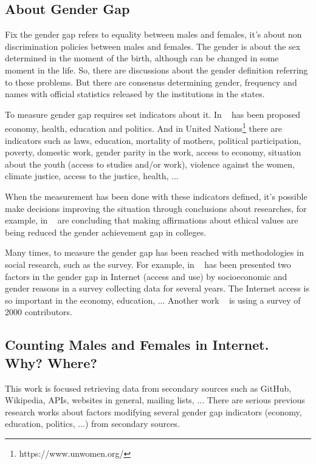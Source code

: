 \documentclass[a4paper]{article}
\begin{document}
\subsection{About Gender Gap}

Fix the gender gap refers to equality between males and females, it's
about non discrimination policies between males and females. The
gender is about the sex determined in the moment of the birth,
although can be changed in some moment in the life. So, there are
discussions about the gender definition referring to these
problems. But there are consensus determining gender, frequency and
names with official statistics released by the institutions in the
states.

To measure gender gap requires set indicators about it. In
~\cite{world2021global} has been proposed economy, health, education
and politics. And in United Nations\footnote{https://www.unwomen.org/}
there are indicators such as laws, education, mortality of mothers,
political participation, poverty, domestic work, gender parity in
the work, access to economy, situation about the youth (access to
studies and/or work), violence against the women, climate justice,
access to the justice, health, ...

When the measurement has been done with these indicators defined, it's
possible make decisions improving the situation through conclusions
about researches, for example, in ~\cite{miyake2010reducing} are
concluding that making affirmations about ethical values are being
reduced the gender achievement gap in colleges.

Many times, to measure the gender gap has been reached with
methodologies in social research, such as the survey. For example, in
~\cite{bimber2000measuring} has been presented two factors in the
gender gap in Internet (access and use) by socioeconomic and gender
reasons in a survey collecting data for several years. The Internet
access is so important in the economy, education, ... Another work
~\cite{10.1007/978-3-319-39225-7_13} is using a survey of 2000
contributors.

\subsection{Counting Males and Females in Internet. Why? Where?}

This work is focused retrieving data from secondary sources such as
GitHub, Wikipedia, APIs, websites in general, mailing lists, ...
There are serious previous research works about factors modifying
several gender gap indicators (economy, education, politics, ...) from
secondary sources.
\end{document}

